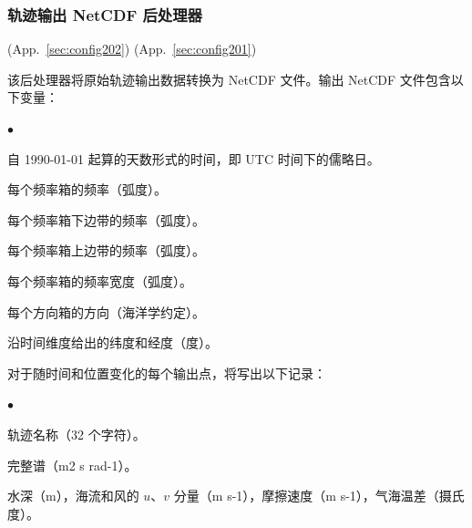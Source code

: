 \vsssub
\subsubsection{轨迹输出 NetCDF 后处理器} \label{sec:ww3trnc}
\vsssub

 (App.~\ref{sec:config202})
 (App.~\ref{sec:config201})

\vspace{\baselineskip}
\noindent
该后处理器将原始轨迹输出数据转换为 NetCDF 文件。输出 NetCDF 文件包含以下变量：

\begin{list}{$\bullet$}{\itemsep 0mm \parsep 0mm}
\item 自 1990-01-01 起算的天数形式的时间，即 UTC 时间下的儒略日。
\item 每个频率箱的频率（弧度）。
\item 每个频率箱下边带的频率（弧度）。
\item 每个频率箱上边带的频率（弧度）。
\item 每个频率箱的频率宽度（弧度）。
\item 每个方向箱的方向（海洋学约定）。
\item 沿时间维度给出的纬度和经度（度）。
\end{list}

\noindent
对于随时间和位置变化的每个输出点，将写出以下记录：
\begin{list}{$\bullet$}{\itemsep 0mm \parsep 0mm}
\item 轨迹名称（32 个字符）。
\item 完整谱（m2 s rad-1）。
\item 水深（m），海流和风的 $u$、$v$ 分量（m s-1），摩擦速度（m s-1），气海温差（摄氏度）。
\end{list}

\pb
